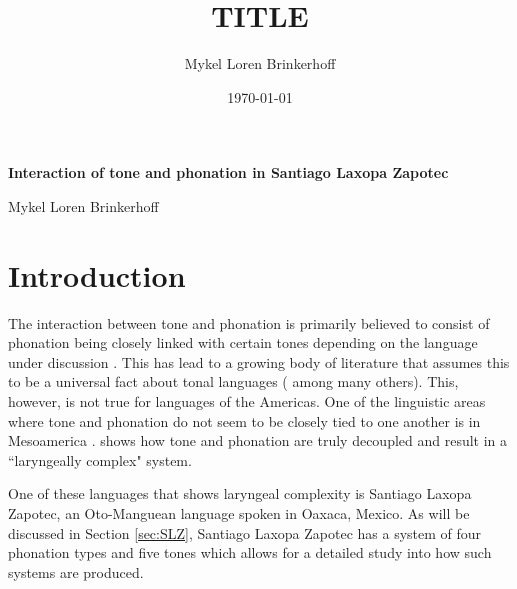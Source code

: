 \documentclass[12pt, letterpaper]{article}
\title{TITLE}
\author{Mykel Loren Brinkerhoff}
\date{\today}
\begin{document}
	
	
	\onehalfspacing
	
\begin{center}
	{\Large \textbf{Interaction of tone and phonation in Santiago Laxopa Zapotec}}
	\vspace{6pt}

	Mykel Loren Brinkerhoff
\end{center}
\thispagestyle{fancy}


\section{Introduction} \label{sec:Introduction}

The interaction between tone and phonation is primarily believed to consist of phonation being closely linked with certain tones depending on the language under discussion \citep{yipTone2002,weePhonologicalTone2019}. This has lead to a growing body of literature that assumes this to be a universal fact about tonal languages (\citet{michaudComplexTonesEast2012,brunelleTonePhonationSoutheast2016,hymanToneSystems2020,garellekPhoneticsWhiteHmong2021} among many others). This, however, is not true for languages of the Americas. One of the linguistic areas where tone and phonation do not seem to be closely tied to one another is in Mesoamerica \citep{campbellMesoAmericaLinguisticArea1986,silvermanLaryngealComplexityOtomanguean1997,campbellOtomangueanHistoricalLinguistics2017a,campbellOtomangueanHistoricalLinguistics2017}. \citet{silvermanLaryngealComplexityOtomanguean1997} shows how tone and phonation are truly decoupled and result in a ``laryngeally complex" system. 

One of these languages that shows laryngeal complexity is Santiago Laxopa Zapotec, an Oto-Manguean language spoken in Oaxaca, Mexico. As will be discussed in Section \ref{sec:SLZ}, Santiago Laxopa Zapotec has a system of four phonation types and five tones which allows for a detailed study into how such systems are produced. 
\end{document}
